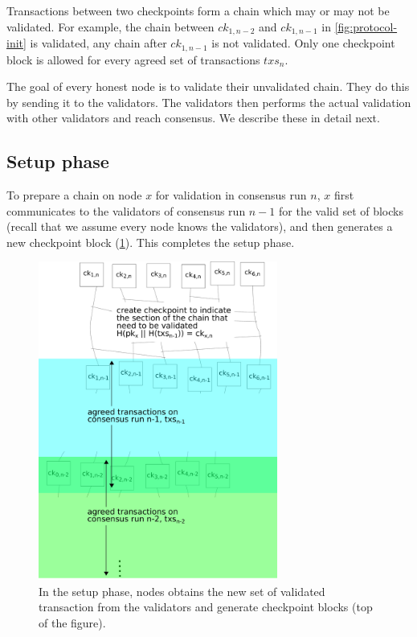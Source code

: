 Transactions between two checkpoints form a chain which may or may not be
validated. For example, the chain between $ck_{1,n-2}$ and
$ck_{1,n-1}$ in \cref{fig:protocol-init} is validated, any chain after
$ck_{1,n-1}$ is not validated. Only one checkpoint block is allowed for
every agreed set of transactions $txs_{n}$.

The goal of every honest node is to validate their unvalidated chain. They do
this by sending it to the validators. The validators then performs the actual
validation with other validators and reach consensus. We describe these in
detail next.

\subsection{Setup phase}

To prepare a chain on node $x$ for validation in consensus run $n$, $x$ first
communicates to the validators of consensus run $n-1$ for the valid set of
blocks (recall that we assume every node knows the validators), and then
generates a new checkpoint block (\cref{fig:protocol-setup}). This completes
the setup phase.

\begin{figure}[htb]
	\centering
	\includegraphics[width=0.7\textwidth]{figures/protocol-setup}
	\caption{In the setup phase, nodes obtains the new set of validated
      transaction from the validators and generate checkpoint blocks (top of the
      figure).}
    \label{fig:protocol-setup}
\end{figure}

